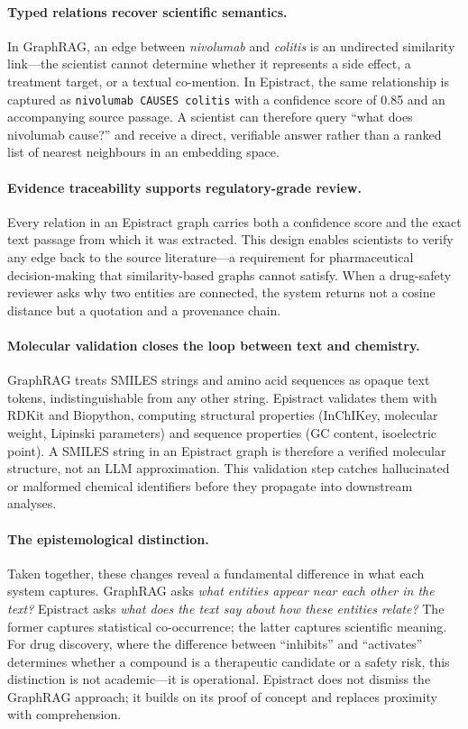 \paragraph{Typed relations recover scientific semantics.}
In GraphRAG, an edge between \emph{nivolumab} and \emph{colitis} is an undirected similarity link---the scientist cannot determine whether it represents a side effect, a treatment target, or a textual co-mention. In Epistract, the same relationship is captured as \texttt{nivolumab \textrightarrow{} CAUSES \textrightarrow{} colitis} with a confidence score of 0.85 and an accompanying source passage. A scientist can therefore query ``what does nivolumab cause?'' and receive a direct, verifiable answer rather than a ranked list of nearest neighbours in an embedding space.

\paragraph{Evidence traceability supports regulatory-grade review.}
Every relation in an Epistract graph carries both a confidence score and the exact text passage from which it was extracted. This design enables scientists to verify any edge back to the source literature---a requirement for pharmaceutical decision-making that similarity-based graphs cannot satisfy. When a drug-safety reviewer asks why two entities are connected, the system returns not a cosine distance but a quotation and a provenance chain.

\paragraph{Molecular validation closes the loop between text and chemistry.}
GraphRAG treats SMILES strings and amino acid sequences as opaque text tokens, indistinguishable from any other string. Epistract validates them with RDKit and Biopython, computing structural properties (InChIKey, molecular weight, Lipinski parameters) and sequence properties (GC content, isoelectric point). A SMILES string in an Epistract graph is therefore a verified molecular structure, not an LLM approximation. This validation step catches hallucinated or malformed chemical identifiers before they propagate into downstream analyses.

\paragraph{The epistemological distinction.}
Taken together, these changes reveal a fundamental difference in what each system captures. GraphRAG asks \emph{what entities appear near each other in the text?} Epistract asks \emph{what does the text say about how these entities relate?} The former captures statistical co-occurrence; the latter captures scientific meaning. For drug discovery, where the difference between ``inhibits'' and ``activates'' determines whether a compound is a therapeutic candidate or a safety risk, this distinction is not academic---it is operational. Epistract does not dismiss the GraphRAG approach; it builds on its proof of concept and replaces proximity with comprehension.

